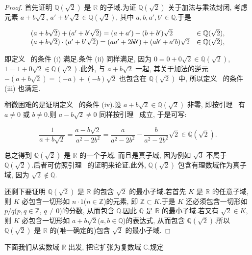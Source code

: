 \begin{proof}
首先证明 $\mathbb{Q}(\sqrt{2})$ 是 $\mathbb{R}$ 的子域.为证 $\mathbb{Q}(\sqrt{2})$ 关于加法与乘法封闭, 考虑元素 $a + b\sqrt{2}$, $a' + b'\sqrt{2} \in \mathbb{Q}(\sqrt{2})$, 其中 $a, b, a', b' \in \mathbb{Q}$.于是

\[
\begin{array}{l l}
(a + b\sqrt{2}) + (a' + b'\sqrt{2}) = (a + a') + (b + b')\sqrt{2} & \in \mathbb{Q}(\sqrt{2}), \\
(a + b\sqrt{2}) \cdot (a' + b'\sqrt{2}) = (aa' + 2bb') + (ab' + a'b)\sqrt{2} & \in \mathbb{Q}(\sqrt{2}),
\end{array}
\]

即定义~ 的条件 (i) 满足.条件 (ii) 同样满足, 因为 $0 = 0 + 0\sqrt{2} \in \mathbb{Q}(\sqrt{2})$, $1 = 1 + 0\sqrt{2} \in \mathbb{Q}(\sqrt{2})$.此外, 与 $a + b\sqrt{2}$ 一起, 其关于加法的逆元 $-(a + b\sqrt{2}) = (-a) + (-b)\sqrt{2}$ 也包含在 $\mathbb{Q}(\sqrt{2})$ 中, 所以定义~ 的条件 (iii) 也满足.

稍微困难的是证明定义~ 的条件 (iv).设 $a + b\sqrt{2} \in \mathbb{Q}(\sqrt{2})$ 非零, 即按引理~ 有 $a \neq 0$ 或 $b \neq 0$.则 $a - b\sqrt{2} \neq 0$ 同样按引理~ 成立, 于是可写:

\[
\frac{1}{a + b\sqrt{2}} = \frac{a - b\sqrt{2}}{a^2 - 2b^2} = \frac{a}{a^2 - 2b^2} - \frac{b}{a^2 - 2b^2}\sqrt{2} \in \mathbb{Q}(\sqrt{2}).
\]

总之得到 $\mathbb{Q}(\sqrt{2})$ 是 $\mathbb{R}$ 的一个子域, 而且是真子域, 因为例如 $\sqrt{3}$ 不属于 $\mathbb{Q}(\sqrt{2})$.后者可仿照引理~ 的证明来论证.此外, $\mathbb{Q}(\sqrt{2})$ 包含有理数域作为真子域, 因为 $\sqrt{2} \notin \mathbb{Q}$.

还剩下要证明 $\mathbb{Q}(\sqrt{2})$ 是 $\mathbb{R}$ 的包含 $\sqrt{2}$ 的最小子域.若首先 $K$ 是 $\mathbb{R}$ 的任意子域, 则 $K$ 必包含一切形如 $n \cdot 1$($n \in \mathbb{Z}$)的元素, 即 $\mathbb{Z} \subset K$.于是 $K$ 还必须包含一切形如 $p/q$($p, q \in \mathbb{Z}$, $q \neq 0$)的分数, 从而包含 $\mathbb{Q}$.因此 $\mathbb{Q}$ 是 $\mathbb{R}$ 的最小子域.若又有 $\sqrt{2} \in K$, 则 $K$ 必包含一切形如 $a + b\sqrt{2}$($a, b \in \mathbb{Q}$)的表达式, 从而包含 $\mathbb{Q}(\sqrt{2})$.所以 $\mathbb{Q}(\sqrt{2})$ 是 $\mathbb{R}$ 的(唯一确定的)包含 $\sqrt{2}$ 的最小子域.
\end{proof}

下面我们从实数域 $\mathbb{R}$ 出发, 把它扩张为复数域 $\mathbb{C}$.规定

